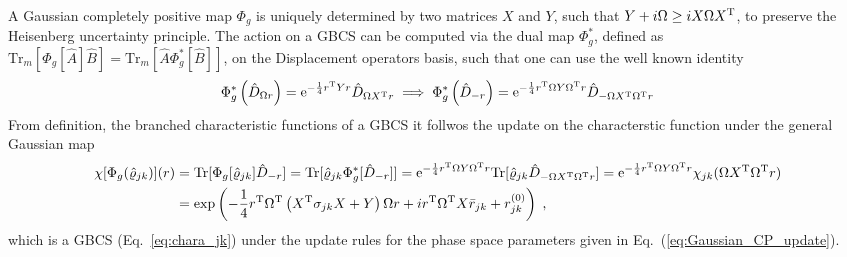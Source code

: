 \documentclass[%
reprint,
superscriptaddress,
nofootinbib,
 amsmath,amssymb,
prx,
floatfix,
]{revtex4-2}
\begin{document}
A Gaussian completely positive map $\Phi_g$ is uniquely determined by two matrices $X$ and $Y$, such that $Y+ i \Omega \geq i X \Omega X^{\rm T}$, to preserve the Heisenberg uncertainty principle. The action on a GBCS can be computed via the dual map $\Phi_g^*$, defined as $\text{Tr}_m \left[\Phi_{g} [\hat{A}]  \hat{B}\right] = \text{Tr}_m \left[\hat{A}  \Phi_{g}^* [\hat{B}]\right]$, on the Displacement operators basis, such that one can use the well known identity 
 \begin{equation}
     \Phi_g^* \left(\hat{D}_{\Omega r} \right) = {\rm e}^{-\frac{1}{4} r^{\rm T}  Y  r }\hat{D}_{\Omega X^{\rm T} r} \implies \Phi_g^* \left(\hat{D}_{- r} \right) = {\rm e}^{-\frac{1}{4} r^{\rm T} \Omega  Y \Omega^{\rm T}  r }\hat{D}_{- \Omega X^{\rm T} \Omega^{\rm T} r}
 \end{equation}
From definition, the branched characteristic functions of a GBCS it follwos the update on the characterstic function under the general Gaussian map 
\begin{align}
    \chi[\Phi_g(\hat{\varrho}_{jk})] (r) &= \text{Tr}[\Phi_g[\hat{\varrho}_{jk}] \hat{D}_{-r}] = \text{Tr}[\hat{\varrho}_{jk} \Phi^*_g[\hat{D}_{- r}]] = {\rm e}^{-\frac{1}{4} r^{\rm T} \Omega  Y \Omega^{\rm T}  r } \text{Tr}[\hat{\varrho}_{jk} \hat{D}_{- \Omega X^{\rm T} \Omega^{\rm T} r} ] =  {\rm e}^{-\frac{1}{4} r^{\rm T} \Omega  Y \Omega^{\rm T}  r } \chi_{jk} (\Omega X^{\rm T} \Omega^{\rm T} r) \nonumber \\
    &=   
  \exp \left( -\frac{1}{4}  r^{\rm T}  \Omega^{\rm T}  \left( X^{\rm T} \sigma_{jk}  X + Y \right) \Omega r  +  i  r^{\rm T} \Omega^{\rm T} X \bar{r}_{jk} + r^{(0)}_{jk}   \right) \;,
\end{align} 
which is a GBCS (Eq.~\ref{eq:chara_jk}) under the update rules for the phase space parameters given in Eq.~(\ref{eq:Gaussian_CP_update}).
\end{document}
